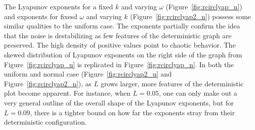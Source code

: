 The Lyapunov exponents for a fixed $k$ and varying $\omega$
(Figure~\ref{fig:rcirclyap_n}) and exponents for fixesd $\omega$ and
varying $k$ (Figure~\ref{fig:rcirclyap2_n}) possess some similar
qualities to the uniform case. The exponents partially confirm the
idea that the noise is destabilizing as few features of the
deterministic graph are preserved. The high density of positive values
point to chaotic behavior. The skewed distribution of Lyapunov exponents on the right side of the graph from
Figure~\ref{fig:rcirclyap_u} is replicated in
Figure~\ref{fig:rcirclyap_n}. In both the uniform and normal case
(Figure~\ref{fig:rcirclyap2_u} and Figure~\ref{fig:rcirclyap2_n}), as $L$ grows larger, more features
of the deterministic plot become apparent. For instance, when
$L=0.05$, one can only make out a very general outline of the overall
shape of the Lyapunov exponents, but for $L=0.09$, there is a tighter
bound on how far the exponents stray from their deterministic configuration. 

